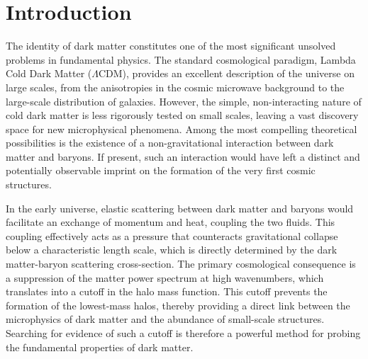 \documentclass[]{article}
\begin{document}
\section{Introduction}
\label{sec:intro}
The identity of dark matter constitutes one of the most significant unsolved problems in fundamental physics.\citep{bahcall2016dark} The standard cosmological paradigm, Lambda Cold Dark Matter ($\Lambda$CDM), provides an excellent description of the universe on large scales, from the anisotropies in the cosmic microwave background to the large-scale distribution of galaxies.\citep{van_den_Aarssen_2012,vandenaarssen2013is,chatterjee2024rulingstronglyinteractingdark,martins2009distributiondarkmattergalaxies,speliotopoulos2007darkenergystructureformation,teixeira2024illuminatingdarksectorsearching} However, the simple, non-interacting nature of cold dark matter is less rigorously tested on small scales, leaving a vast discovery space for new microphysical phenomena.\citep{van_den_Aarssen_2012,vandenaarssen2013is,chatterjee2024rulingstronglyinteractingdark,martins2009distributiondarkmattergalaxies,speliotopoulos2007darkenergystructureformation,brito2022snowmass2021cosmicfrontierwhite} Among the most compelling theoretical possibilities is the existence of a non-gravitational interaction between dark matter and baryons.\citep{van_den_Aarssen_2012,vandenaarssen2013is} If present, such an interaction would have left a distinct and potentially observable imprint on the formation of the very first cosmic structures.\citep{gluscevic2019cosmologicalprobesdarkmatter,chatterjee2024rulingstronglyinteractingdark,Wang_2016,brito2022snowmass2021cosmicfrontierwhite}

In the early universe, elastic scattering between dark matter and baryons would facilitate an exchange of momentum and heat, coupling the two fluids.\citep{tashiro2014effectsdarkmatterbaryonscattering,short2022darkmatterbaryonscatteringeffects} This coupling effectively acts as a pressure that counteracts gravitational collapse below a characteristic length scale, which is directly determined by the dark matter-baryon scattering cross-section. The primary cosmological consequence is a suppression of the matter power spectrum at high wavenumbers, which translates into a cutoff in the halo mass function.\citep{short2022darkmatterbaryonscatteringeffects,Sameie_2019,Schaeffer_2021,Bose_2019} This cutoff prevents the formation of the lowest-mass halos, thereby providing a direct link between the microphysics of dark matter and the abundance of small-scale structures.\citep{Sameie_2019,Diaz_Rivero_2018,moustakas2009stronggravitationallensingprobes,Schaeffer_2021} Searching for evidence of such a cutoff is therefore a powerful method for probing the fundamental properties of dark matter.\citep{Diaz_Rivero_2018,moustakas2009stronggravitationallensingprobes,Schaeffer_2021}
\end{document}
